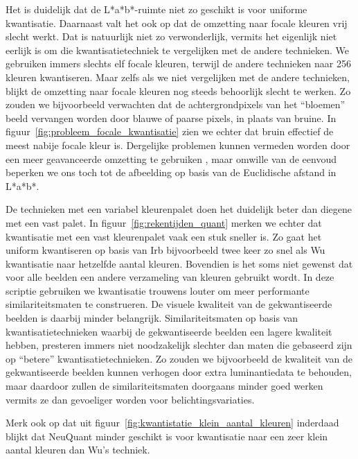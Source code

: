 Het is duidelijk dat de L*a*b*-ruimte niet zo geschikt is voor uniforme kwantisatie. 
Daarnaast valt het ook op
dat de omzetting naar focale kleuren vrij slecht werkt. Dat is natuurlijk niet zo 
verwonderlijk, vermits het eigenlijk niet eerlijk is om die kwantisatietechniek te 
vergelijken met de andere technieken. We gebruiken immers slechts elf focale kleuren, 
terwijl de andere technieken naar 256 kleuren kwantiseren. Maar zelfs als we niet
vergelijken met de andere technieken, blijkt de omzetting naar focale kleuren 
nog steeds behoorlijk slecht te werken. Zo zouden we bijvoorbeeld verwachten
dat de achtergrondpixels van het ``bloemen'' beeld vervangen worden door blauwe of
paarse pixels, in plaats van bruine. In figuur~\ref{fig:probleem_focale_kwantisatie} zien
we echter dat bruin effectief de meest nabije focale kleur is. Dergelijke problemen
kunnen vermeden worden door een meer geavanceerde omzetting te gebruiken 
\cite{van_den_broek:human_color_categorization_for_cbir}, maar omwille van de eenvoud 
beperken we ons toch tot de afbeelding op basis van de Euclidische afstand in L*a*b*.

De technieken met een variabel kleurenpalet doen het duidelijk beter dan diegene met een vast palet. 
In figuur~\ref{fig:rekentijden_quant} merken we echter dat kwantisatie met een vast kleurenpalet 
vaak een stuk sneller is. Zo gaat het uniform kwantiseren op basis van Irb bijvoorbeeld
twee keer zo snel als Wu kwantisatie naar hetzelfde aantal kleuren. Bovendien is het soms niet
gewenst dat voor alle beelden een andere verzameling van kleuren gebruikt wordt. In deze scriptie gebruiken
we kwantisatie trouwens louter om meer performante similariteitsmaten te construeren. De visuele kwaliteit
van de gekwantiseerde beelden is daarbij minder belangrijk. Similariteitsmaten op basis van kwantisatietechnieken 
waarbij de gekwantiseerde beelden een lagere kwaliteit hebben, presteren immers niet noodzakelijk
slechter dan maten die gebaseerd zijn op ``betere'' kwantisatietechnieken. Zo zouden we bijvoorbeeld 
de kwaliteit van de gekwantiseerde beelden kunnen verhogen door extra luminantiedata te behouden, maar daardoor zullen
de similariteitsmaten doorgaans minder goed werken vermits ze dan gevoeliger worden voor 
belichtingsvariaties.

Merk ook op dat uit figuur~\ref{fig:kwantistatie_klein_aantal_kleuren} inderdaad blijkt
dat NeuQuant minder geschikt is voor kwantisatie naar een zeer klein
aantal kleuren dan Wu's techniek. 

